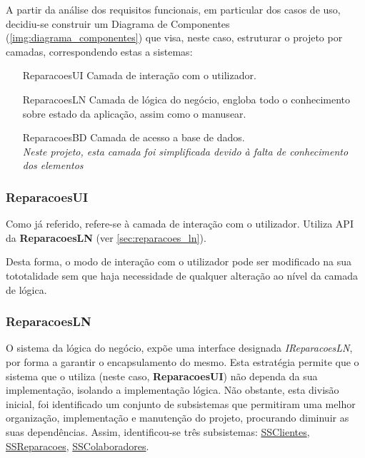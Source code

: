 \documentclass[../relatorio.tex]{subfiles}
\begin{document}
A partir da análise dos requisitos funcionais, em particular dos casos de uso,
decidiu-se construir um Diagrama de Componentes (\ref{img:diagrama_componentes}) que visa, neste caso,
estruturar o projeto por camadas, correspondendo estas a sistemas:
\begin{itemize}
    \item[ReparacoesUI]{
          Camada de interação com o utilizador.
          }
    \item[ReparacoesLN]{
          Camada de lógica do negócio, engloba todo o conhecimento sobre estado
          da aplicação, assim como o manusear.
          }
    \item[ReparacoesBD] {
          Camada de acesso a base de dados. \\
          \textit{Neste projeto, esta camada foi simplificada devido
              à falta de conhecimento dos elementos}
          }
\end{itemize}

\subsubsection*{ReparacoesUI} \label{sec:reparacoes_ui}
Como já referido, refere-se à camada de interação com o utilizador.
Utiliza API da \textbf{ReparacoesLN} (ver \ref{sec:reparacoes_ln}).

Desta forma, o modo de interação com o utilizador pode ser modificado na sua tototalidade
sem que haja necessidade de qualquer alteração ao nível da camada de lógica.

\subsubsection*{ReparacoesLN} \label{sec:reparacoes_ln}
O sistema da lógica do negócio, expõe uma interface designada \textit{IReparacoesLN}, por forma a garantir o encapsulamento do mesmo.
Esta estratégia permite que o sistema que o utiliza (neste caso, \textbf{ReparacoesUI})
não dependa da sua implementação, isolando a implementação lógica.
Não obstante, esta divisão inicial, foi identificado um conjunto de subsistemas que permitiram
uma melhor organização, implementação e manutenção do projeto, procurando diminuir as suas dependências.
Assim, identificou-se três subsistemas: \underline{SSClientes}, \underline{SSReparacoes}, \underline{SSColaboradores}.
\end{document}
